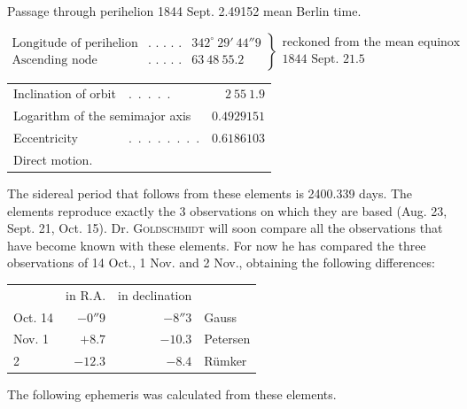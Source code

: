 \begin{center}
Passage through perihelion 1844 Sept. 2.49152 mean Berlin time.
\end{center}
{\small
\setlength{\arraycolsep}{2.5pt}
\[
\left.\begin{array}{llr}
\text{Longitude of perihelion} & \text{.\ .\ .\ .\ .} & 342^\circ\ 29'\ 44''9 \\
\text{Ascending node} & \text{.\ .\ .\ .\ .} & 63\ 48\ 55.2
\end{array}\right\}
\begin{array}{l}
\text{reckoned from the mean equinox} \\
\text{1844 Sept. 21.5}
\end{array}
\]
}
\begin{center}
\setlength{\tabcolsep}{4pt}
\begin{tabular}{llr}
Inclination of orbit & \mbox{.\ .\ .\ .\ .} & $2\ 55\ 1.9$ \\
\multicolumn{2}{l}{Logarithm of the semimajor axis} & $0.4929151$ \\
Eccentricity & \mbox{.\ .\ .\ .\ .\ .\ .\ .} & $0.6186103$ \\
\multicolumn{3}{l}{Direct motion.}
\end{tabular}
\end{center}

The sidereal period that follows from these elements is 2400.339 days. The elements reproduce exactly the 3 observations on which they are based (Aug. 23, Sept. 21, Oct. 15). Dr. \textsc{Goldschmidt} will soon compare all the observations that have become known with these elements. For now he has compared the three observations of 14 Oct., 1 Nov. and 2 Nov., obtaining the following differences:

\begin{center}
\begin{tabular}{lrrl}
 & in R.A. & in declination & \\
Oct. 14 & $-0''9$ & $-8''3$ & Gauss \\
Nov. 1 & $+8.7$ & $-10.3$ & Petersen \\
\hfill 2 & $-12.3$ & $-8.4$ & Rümker \\
\end{tabular}
\end{center}

The following ephemeris was calculated from these elements.

